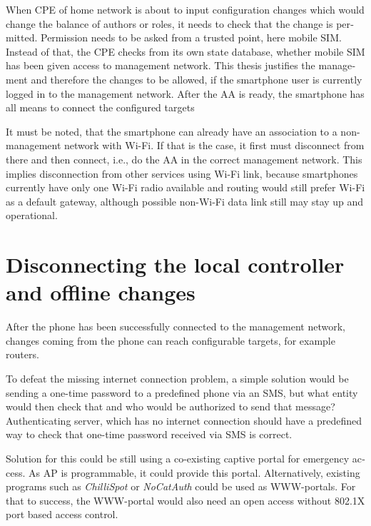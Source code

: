 \documentclass[12pt,a4paper,english]{tutthesis}
\begin{document}
\begin{otherlanguage}{english}
When CPE of home network is about to input configuration changes which
would change the balance of authors or roles, it needs to check that
the change is permitted.  Permission needs to be asked from a trusted
point, here mobile SIM. Instead of that, the CPE checks from its own
state database, whether mobile SIM has been given access to management
network.
This thesis justifies the management and therefore the changes to be
allowed, if the smartphone user is currently logged in to the
management network.
After the AA is ready, the smartphone has all means to connect the
configured targets

It must be noted, that the smartphone can already have an association
to a non-management network with Wi-Fi. If that is the case, it first
must disconnect from there and then connect, i.e., do the  AA in the correct management
network. This implies disconnection from other services using Wi-Fi
link, because smartphones currently have only one Wi-Fi radio
available and routing would still prefer Wi-Fi as a default gateway, although
possible non-Wi-Fi data link still may stay up and operational.
\section{Disconnecting the local controller and offline changes}
\label{sec-4-6}
\label{sec:disconnections}


After the phone has been successfully connected to the management
network, changes coming from the phone can reach configurable targets,
for example routers.  















To defeat the missing internet connection problem, a simple solution would be
sending a one-time password to a predefined phone via an SMS, but what
entity would then check that and who would be authorized to send that message?
Authenticating server, which has no internet connection should 
have a predefined way to check that one-time password received via SMS is correct.

Solution for this could be still using a co-existing captive portal
for emergency access. As AP is programmable, it could
provide this portal.  Alternatively, existing programs such as
\emph{ChilliSpot} or \emph{NoCatAuth} could be used as WWW-portals.  For that to
success, the WWW-portal would also need an open access without 802.1X
port based access control.


\end{otherlanguage}
\end{document}
